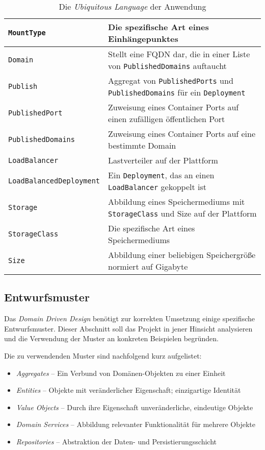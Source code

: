 \begin{table}[H]
\begin{tabulary}{\textwidth}{|L|L|}
        \texttt{MountType} & Die spezifische Art eines Einhängepunktes \\
        \hline
        \texttt{Domain} & Stellt eine FQDN dar, die in einer Liste von \texttt{PublishedDomains} auftaucht \\
        \hline
        \texttt{Publish} & Aggregat von \texttt{PublishedPorts} und \texttt{PublishedDomains} für ein \texttt{Deployment} \\
        \hline
        \texttt{PublishedPort} & Zuweisung eines Container Ports auf einen zufälligen öffentlichen Port \\
        \hline
        \texttt{PublishedDomains} & Zuweisung eines Container Ports auf eine bestimmte Domain \\
        \hline
        \texttt{LoadBalancer} & Lastverteiler auf der Plattform \\
        \hline
        \texttt{LoadBalancedDeployment} & Ein \texttt{Deployment}, das an einen \texttt{LoadBalancer} gekoppelt ist \\
        \hline
        \texttt{Storage} & Abbildung eines Speichermediums mit \texttt{StorageClass} und Size auf der Plattform \\
        \hline
        \texttt{StorageClass} & Die spezifische Art eines Speichermediums \\
        \hline
        \texttt{Size} & Abbildung einer beliebigen Speichergröße normiert auf Gigabyte \\
        \hline
    \end{tabulary}

    \caption{Die \emph{Ubiquitous Language} der Anwendung}
    \label{tab:vergleich_tooling_support}
\end{table}

\subsection{Entwurfsmuster}
\label{subsec:entwurfsmuster}

Das \emph{Domain Driven Design} benötigt zur korrekten Umsetzung einige spezifische Entwurfsmuster.
Dieser Abschnitt soll das Projekt in jener Hinsicht analysieren und die Verwendung der Muster an konkreten Beispielen begründen.

Die zu verwendenden Muster sind nachfolgend kurz aufgelistet:

\begin{itemize}
    \item \emph{Aggregates} -- Ein Verbund von Domänen-Objekten zu einer Einheit
    \item \emph{Entities} -- Objekte mit veränderlicher Eigenschaft; einzigartige Identität 
    \item \emph{Value Objects} -- Durch ihre Eigenschaft unveränderliche, eindeutige Objekte 
    \item \emph{Domain Services} -- Abbildung relevanter Funktionalität für mehrere Objekte
    \item \emph{Repositories} -- Abstraktion der Daten- und Persistierungsschicht
\end{itemize}

